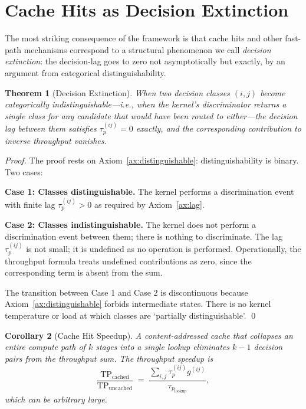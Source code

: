 \documentclass[twocolumn,11pt,a4paper]{article}
\newtheorem{theorem}{Theorem}[section]
\newtheorem{corollary}[theorem]{Corollary}
\newcommand{\TP}{\mathrm{TP}}
\newcommand{\taup}{\tau_p}
\begin{document}
\section{Cache Hits as Decision Extinction}
\label{sec:extinction}

The most striking consequence of the framework is that cache hits and other fast-path mechanisms correspond to a structural phenomenon we call \emph{decision extinction}: the decision-lag goes to zero not asymptotically but exactly, by an argument from categorical distinguishability.

\begin{theorem}[Decision Extinction]
\label{thm:extinction}
When two decision classes $(i, j)$ become categorically indistinguishable---i.e., when the kernel's discriminator returns a single class for any candidate that would have been routed to either---the decision lag between them satisfies $\taup^{(ij)} = 0$ exactly, and the corresponding contribution to inverse throughput vanishes.
\end{theorem}

\begin{proof}
The proof rests on Axiom~\ref{ax:distinguishable}: distinguishability is binary. Two cases:

\textbf{Case 1: Classes distinguishable.} The kernel performs a discrimination event with finite lag $\taup^{(ij)} > 0$ as required by Axiom~\ref{ax:lag}.

\textbf{Case 2: Classes indistinguishable.} The kernel does not perform a discrimination event between them; there is nothing to discriminate. The lag $\taup^{(ij)}$ is not small; it is undefined as no operation is performed. Operationally, the throughput formula treats undefined contributions as zero, since the corresponding term is absent from the sum.

The transition between Case 1 and Case 2 is discontinuous because Axiom~\ref{ax:distinguishable} forbids intermediate states. There is no kernel temperature or load at which classes are `partially distinguishable'. \qed
\end{proof}

\begin{corollary}[Cache Hit Speedup]
\label{cor:cache}
A content-addressed cache that collapses an entire compute path of $k$ stages into a single lookup eliminates $k-1$ decision pairs from the throughput sum. The throughput speedup is
\[
\frac{\TP_\mathrm{cached}}{\TP_\mathrm{uncached}} \;=\; \frac{\sum_{i,j} \taup^{(ij)} g^{(ij)}}{\taup_\mathrm{lookup}},
\]
which can be arbitrary large.
\end{corollary}
\end{document}
